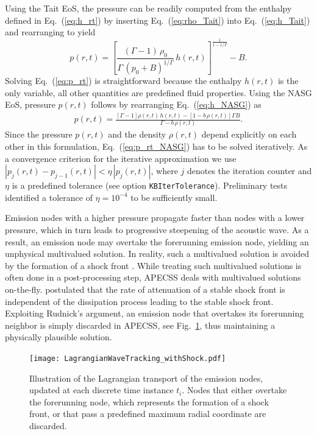 Using the Tait EoS, the pressure can be readily computed from the enthalpy defined in Eq.~(\ref{eq:h_rt}) by inserting Eq.~(\ref{eq:rho_Tait}) into Eq.~(\ref{eq:h_Tait}) and rearranging to yield
\begin{equation}
    p(r,t) = \left[ \frac{(\Gamma-1) \, \rho_0}{\Gamma \, (p_0+B)^{1/\Gamma}} \, h(r,t) \right]^{\frac{1}{1-1/\Gamma}} - B. \label{eq:p_rt}
\end{equation}
Solving Eq.~(\ref{eq:p_rt}) is straightforward because the enthalpy $h(r,t)$ is the only variable, all other quantities are predefined fluid properties. Using the NASG EoS, pressure $p(r,t)$ follows by rearranging Eq.~(\ref{eq:h_NASG}) as
\begin{eqnarray}
p(r,t) = \frac{\left[\Gamma-1\right] \rho(r,t) \, h(r,t) - \left[1 - b \, \rho(r,t) \right] \Gamma B}{\Gamma - b \, \rho(r,t)}.  \label{eq:p_rt_NASG}
\end{eqnarray}
Since the pressure $p(r,t)$ and the density $\rho(r,t)$ depend explicitly on each other in this formulation, Eq.~(\ref{eq:p_rt_NASG}) has to be solved iteratively. As a convergence criterion for the iterative approximation we use $|p_j(r,t) - p_{j-1}(r,t)| < \eta \, |p_j(r,t)|$, where $j$ denotes the iteration counter and $\eta$ is a predefined tolerance (see option {\tt KBIterTolerance}). Preliminary tests identified a tolerance of $\eta = 10^{-4}$ to be sufficiently small.

Emission nodes with a higher pressure propagate faster than nodes with a lower pressure, which in turn leads to progressive steepening of the acoustic wave. As a result, an emission node may overtake the forerunning emission node, yielding an unphysical multivalued solution. In reality, such a multivalued solution is avoided by the formation of a shock front \citep{Fay1931}. While treating such multivalued solutions is often done in a post-processing step, APECSS deals with multivalued solutions on-the-fly. \citet{Rudnick1952} postulated that the rate of attenuation of a stable shock front is independent of the dissipation process leading to the stable shock front. Exploiting Rudnick's argument, an emission node that overtakes its forerunning neighbor is simply discarded in APECSS, see Fig.~\ref{fig:lagrangiantrackingshock}, thus maintaining a physically plausible solution.

\begin{figure}
    \begin{center}
    \texttt{[image: LagrangianWaveTracking\_withShock.pdf]}
    \caption{Illustration of the Lagrangian transport of the emission nodes, updated at each discrete time instance $t_i$. Nodes that either overtake the forerunning node, which represents the formation of a shock front, or that pass a predefined maximum radial coordinate are discarded.}
    \label{fig:lagrangiantrackingshock}
    \end{center}
\end{figure}


